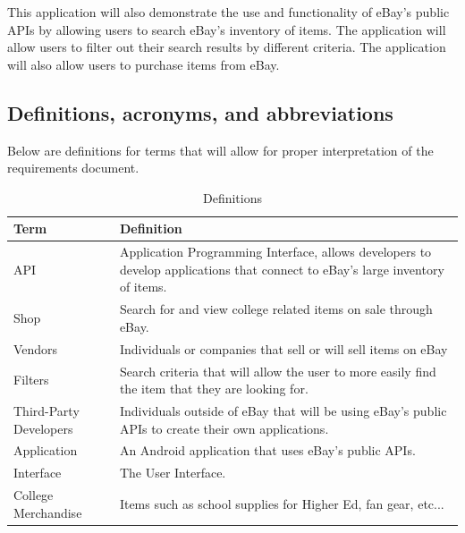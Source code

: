 \documentclass[journal,compsoc, 10pt, draftclsnofoot, onecolumn]{IEEEtran}
\begin{document}
This application will also demonstrate the use and functionality of eBay's 
public APIs by allowing users to search eBay's inventory of items. The 
application will allow users to filter out their search results by different 
criteria. The application will also allow users to purchase items from eBay. 

\subsection{Definitions, acronyms, and abbreviations}

Below are definitions for terms that will allow for proper interpretation of the
 requirements document.

\begin{table}[]
\centering
\caption{Definitions}
\label{my-label}
\begin{tabularx}{\textwidth}{l|X}
\hline
\textbf{Term}               & \textbf{Definition}                                                                                                           \\ \hline
API                    	      & Application Programming Interface, allows developers to develop applications that connect to eBay's large inventory of items. \\ \hline
Shop                   	      & Search for and view college related items on sale through eBay.                                                               \\ \hline
Vendors               	      & Individuals or companies that sell or will sell items on eBay                                                                 \\ \hline
Filters                	      & Search criteria that will allow the user to more easily find the item that they are looking for.                              \\ \hline
Third-Party Developers & Individuals outside of eBay that will be using eBay's public APIs to create their own applications.                           \\ \hline
Application            	      & An Android application that uses eBay's public APIs.                                                                          \\ \hline
Interface              	      & The User Interface.                                                                                                           \\ \hline
College Merchandise     & Items such as school supplies for Higher Ed, fan gear, etc...                                                                 \\ \hline

\end{tabularx}
\end{table}
\end{document}
